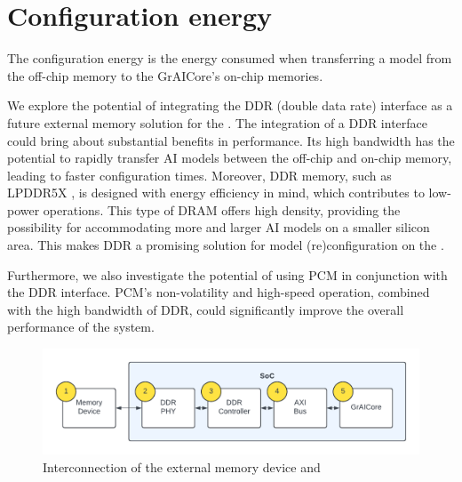 \section{Configuration energy}
\label{section:configuration_energy}
The configuration energy is the energy consumed when transferring a model from the off-chip memory to the GrAICore's on-chip memories.

We explore the potential of integrating the DDR (double data rate) interface as a future external memory solution for the \graicore{}.
The integration of a DDR interface could bring about substantial benefits in performance.
Its high bandwidth has the potential to rapidly transfer AI models between the off-chip and on-chip memory, leading to faster configuration times.
Moreover, DDR memory, such as LPDDR5X \cite{JEDEC_JESD209-5C}, is designed with energy efficiency in mind, which contributes to low-power operations.
This type of DRAM offers high density, providing the possibility for accommodating more and larger AI models on a smaller silicon area.
This makes DDR a promising solution for model (re)configuration on the \graicore{}.

Furthermore, we also investigate the potential of using PCM in conjunction with the DDR interface.
PCM's non-volatility and high-speed operation, combined with the high bandwidth of DDR, could significantly improve the overall performance of the system.

\begin{figure}[hbtp]
    \centering
    \includegraphics[width=\linewidth]{assets/ddr_graicore_block_diagram.pdf}
    \caption{
        Interconnection of the external memory device and \graicore{}
    }
    \label{fig:ddr_graicore_block_diagram}
\end{figure}

